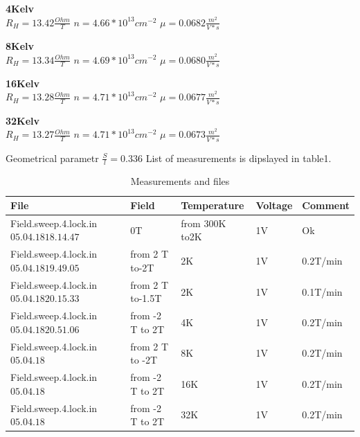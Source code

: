 \documentclass[idxtotoc,hyperref,openany,oneside]{labbook} %
\begin{document}
\normalsize \textbf{4Kelv}\\
$R_H=13.42 \frac{Ohm}{T}$
\newline
$n=4.66*10^{13} cm^{-2}$
\newline
$\mu= 0.0682\frac{m^2}{V*s}$
\newline
\newline


\normalsize \textbf{8Kelv}\\
$R_H=13.34 \frac{Ohm}{T}$
\newline
$n=4.69*10^{13} cm^{-2}$
\newline
$\mu= 0.0680\frac{m^2}{V*s}$
\newline
\newline

\normalsize \textbf{16Kelv}\\
$R_H=13.28 \frac{Ohm}{T}$
\newline
$n=4.71*10^{13} cm^{-2}$
\newline
$\mu= 0.0677\frac{m^2}{V*s}$
\newline
\newline

\normalsize \textbf{32Kelv}\\
$R_H=13.27 \frac{Ohm}{T}$
\newline
$n=4.71*10^{13} cm^{-2}$
\newline
$\mu= 0.0673\frac{m^2}{V*s}$
\newline
\newline


Geometrical parametr $\frac{S}{l}=0.336$
\newline
{}
List of measurements is dipslayed in  table1.
 \begin{table}[H]
\begin{tabular}{l l l l l}
\toprule
\textbf{File} & \textbf{Field} & \textbf{Temperature}& \textbf{Voltage}& \textbf{Comment}\\
\toprule
Field.sweep.4.lock.in$05.04.18 18.14.47$& 0T   & from 300K to2K & 1V& Ok\\
Field.sweep.4.lock.in$05.04.18 19.49.05$& from 2 T to-2T   & 2K & 1V& 0.2T/min\\
Field.sweep.4.lock.in$05.04.18 20.15.33$& from 2 T to-1.5T   & 2K & 1V& 0.1T/min\\
Field.sweep.4.lock.in$05.04.18 20.51.06$& from -2 T to 2T   & 4K & 1V& 0.2T/min\\
Field.sweep.4.lock.in$05.04.18 $& from 2 T to -2T   & 8K & 1V& 0.2T/min\\
Field.sweep.4.lock.in$05.04.18 $& from -2 T to 2T   & 16K & 1V& 0.2T/min\\
Field.sweep.4.lock.in$05.04.18 $& from -2 T to 2T   & 32K & 1V& 0.2T/min\\




\bottomrule
\end{tabular}
\caption{Measurements and files}
\label{tab:Measurements and files}
\end{table}
\end{document}

